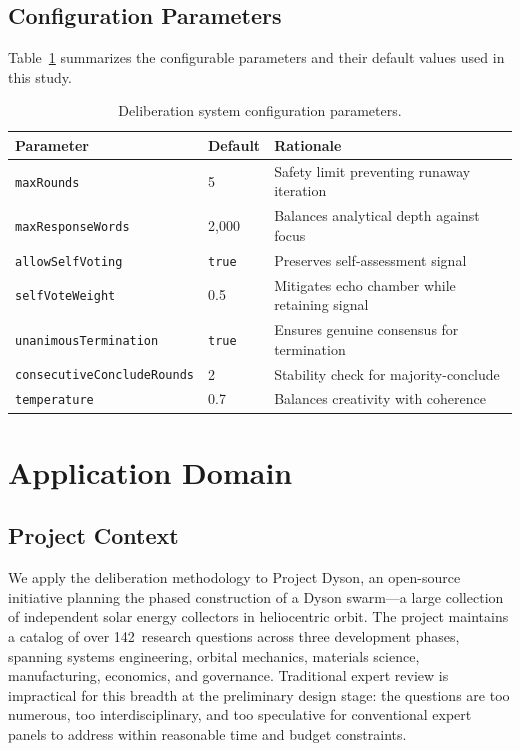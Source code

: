\documentclass[11pt,a4paper]{article}
\begin{document}
\subsection{Configuration Parameters}
\label{sec:config}

Table~\ref{tab:config} summarizes the configurable parameters and their default values used in this study.

\begin{table}[ht]
\centering
\caption{Deliberation system configuration parameters.}
\label{tab:config}
\begin{tabular}{@{}llp{5.5cm}@{}}
\toprule
\textbf{Parameter} & \textbf{Default} & \textbf{Rationale} \\
\midrule
\texttt{maxRounds} & 5 & Safety limit preventing runaway iteration \\
\texttt{maxResponseWords} & 2{,}000 & Balances analytical depth against focus \\
\texttt{allowSelfVoting} & \texttt{true} & Preserves self-assessment signal \\
\texttt{selfVoteWeight} & 0.5 & Mitigates echo chamber while retaining signal \\
\texttt{unanimousTermination} & \texttt{true} & Ensures genuine consensus for termination \\
\texttt{consecutiveConcludeRounds} & 2 & Stability check for majority-conclude \\
\texttt{temperature} & 0.7 & Balances creativity with coherence \\
\bottomrule
\end{tabular}
\end{table}

\section{Application Domain}
\label{sec:domain}

\subsection{Project Context}

We apply the deliberation methodology to Project Dyson, an open-source initiative planning the phased construction of a Dyson swarm---a large collection of independent solar energy collectors in heliocentric orbit. The project maintains a catalog of over 142~research questions across three development phases, spanning systems engineering, orbital mechanics, materials science, manufacturing, economics, and governance. Traditional expert review is impractical for this breadth at the preliminary design stage: the questions are too numerous, too interdisciplinary, and too speculative for conventional expert panels to address within reasonable time and budget constraints.
\end{document}
